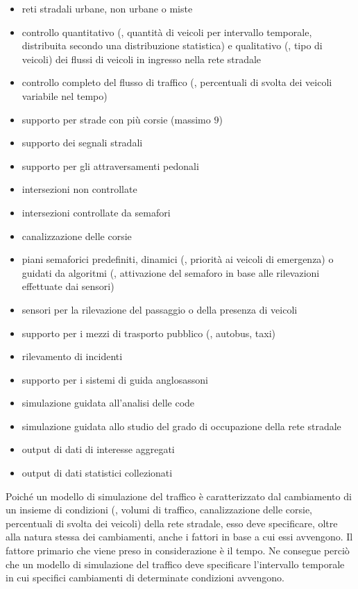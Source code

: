 \begin{itemize}
    \item reti stradali urbane, non urbane o miste
    \item controllo quantitativo (\ie{}, quantità di veicoli per intervallo temporale, distribuita secondo una distribuzione statistica) e qualitativo (\ie{}, tipo di veicoli) dei flussi di veicoli in ingresso nella rete stradale
    \item controllo completo del flusso di traffico (\ie{}, percentuali di svolta dei veicoli variabile nel tempo)
    \item supporto per strade con più corsie (massimo $9$)
    \item supporto dei segnali stradali
    \item supporto per gli attraversamenti pedonali
    \item intersezioni non controllate
    \item intersezioni controllate da semafori
    \item canalizzazione delle corsie
    \item piani semaforici predefiniti, dinamici (\eg{}, priorità ai veicoli di emergenza) o guidati da algoritmi (\eg{}, attivazione del semaforo in base alle rilevazioni effettuate dai sensori)
    \item sensori per la rilevazione del passaggio o della presenza di veicoli
    \item supporto per i mezzi di trasporto pubblico (\ie{}, autobus, taxi)
    \item rilevamento di incidenti
    \item supporto per i sistemi di guida anglosassoni
    \item simulazione guidata all'analisi delle code
    \item simulazione guidata allo studio del grado di occupazione della rete stradale
    \item output di dati di interesse aggregati
    \item output di dati statistici collezionati
\end{itemize}

Poiché un modello di simulazione del traffico è caratterizzato dal cambiamento di un insieme di condizioni (\eg{}, volumi di traffico, canalizzazione delle corsie, percentuali di svolta dei veicoli) della rete stradale, esso deve specificare, oltre alla natura stessa dei cambiamenti, anche i fattori in base a cui essi avvengono. Il fattore primario che viene preso in considerazione è il tempo. Ne consegue perciò che un modello di simulazione del traffico deve specificare l'intervallo temporale in cui specifici cambiamenti di determinate condizioni avvengono.

